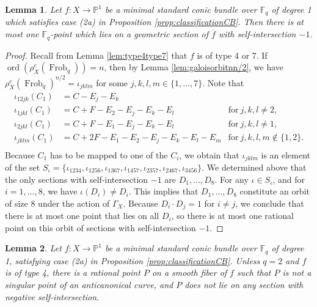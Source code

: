 \documentclass[a4paper, 11pt, reqno]{amsart}
\numberwithin{equation}{section} \numberwithin{figure}{section}
\DeclareMathOperator{\ord}{ord}
\DeclareMathOperator{\Frob}{Frob}
\def \F {{\mathbb F}}
\def \P {{\mathbb P}}
\newcommand{\ra}{\rightarrow}
\newtheorem{lemma}{Lemma}
\theoremstyle{definition}
\numberwithin{lemma}{section}
\begin{document}
\begin{lemma}\label{lem:(4)rationalpointsections}
    Let $f \colon X \ra \P^1$ be a minimal standard conic bundle over $\F_q$ of degree 1 which satisfies case (2a) in Proposition \ref{prop:classificationCB}. Then there is at most one $\F_q$-point which lies on a geometric section of $\overline{f}$ with self-intersection $-1$.
\end{lemma}

\begin{proof}
    Recall from Lemma \ref{lem:type4type7} that $f$ is of type 4 or 7. If $\ord(\rho_X^c(\Frob_q)) = n$, then by Lemma \ref{lem:galoisorbitnn/2}, we have $\rho_X^c(\Frob_q)^{n/2} = \iota_{jklm}$ for some $j, k, l, m \in \{1, \ldots, 7\}$. Note that
    \begin{align*}
        \iota_{12jk}(C_1) &= C - E_j - E_k \\
        \iota_{1jkl}(C_1) &= C + F - E_2 - E_j - E_k - E_l &\text{for} \ j, k, l \neq 2,\\
        \iota_{2jkl}(C_1) &= C + F - E_1 - E_j - E_k - E_l &\text{for} \ j, k, l \neq 1,\\
        \iota_{jklm}(C_1) &= C + 2F - E_1 - E_2 - E_j - E_k - E_l - E_m&\text{for} \ j, k, l, m \notin\{1, 2\}.\\
    \end{align*}
    Because $C_1$ has to be mapped to one of the $C_i$, we obtain that $\iota_{jklm}$ is an element of the set $S_{\iota} = \{\iota_{1234}, \iota_{1256}, \iota_{1367}, \iota_{1457}, \iota_{2357}, \iota_{2467}, \iota_{3456}\}$. We determined above that the only sections with self-intersection $-1$ are $D_1, \ldots, D_8$. For any $\iota \in S_{\iota}$, and for $i = 1, \ldots, 8$, we have $\iota(D_i) \neq D_i$. This implies that $D_1, \ldots, D_8$ constitute an orbit of size 8 under the action of $\Gamma_X$. Because $D_i \cdot D_j = 1$ for $i \neq j$, we conclude that there is at most one point that lies on all $D_i$, so there is at most one rational point on this orbit of sections with self-intersection $-1$. 
\end{proof}

\begin{lemma}\label{lem:(4)existencerationalpoint}
    Let $f \colon X \ra \P^1$ be a minimal standard conic bundle over $\F_q$ of degree 1, satisfying case (2a) in Proposition \ref{prop:classificationCB}. Unless $q = 2$ and $f$ is of type 4, there is a rational point $P$ on a smooth fiber of $f$ such that $P$ is not a singular point of an anticanonical curve, and $P$ does not lie on any section with negative self-intersection. 
\end{lemma}
\end{document}
